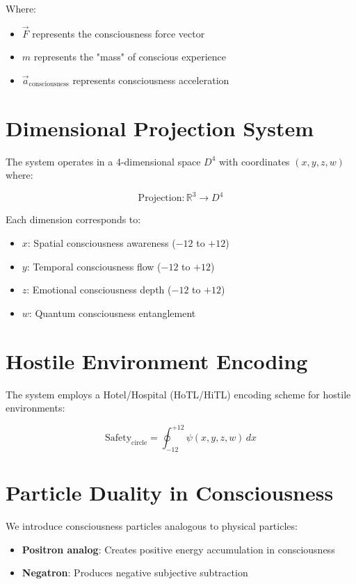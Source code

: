 \documentclass{article}
\begin{document}
Where:
\begin{itemize}
    \item $\vec{F}$ represents the consciousness force vector
    \item $m$ represents the "mass" of conscious experience
    \item $\vec{a}_{\text{consciousness}}$ represents consciousness acceleration
\end{itemize}

\section{Dimensional Projection System}

The system operates in a 4-dimensional space $D^4$ with coordinates $(x, y, z, w)$ where:

\begin{equation}
\text{Projection}: \mathbb{R}^3 \rightarrow D^4
\end{equation}

Each dimension corresponds to:
\begin{itemize}
    \item $x$: Spatial consciousness awareness ($-12$ to $+12$)
    \item $y$: Temporal consciousness flow ($-12$ to $+12$)
    \item $z$: Emotional consciousness depth ($-12$ to $+12$)
    \item $w$: Quantum consciousness entanglement
\end{itemize}

\section{Hostile Environment Encoding}

The system employs a Hotel/Hospital (HoTL/HiTL) encoding scheme for hostile environments:

\begin{equation}
\text{Safety}_{\text{circle}} = \oint_{-12}^{+12} \psi(x,y,z,w) \, dx
\end{equation}

\section{Particle Duality in Consciousness}

We introduce consciousness particles analogous to physical particles:

\begin{itemize}
    \item \textbf{Positron analog}: Creates positive energy accumulation in consciousness
    \item \textbf{Negatron}: Produces negative subjective subtraction
\end{itemize}
\end{document}

